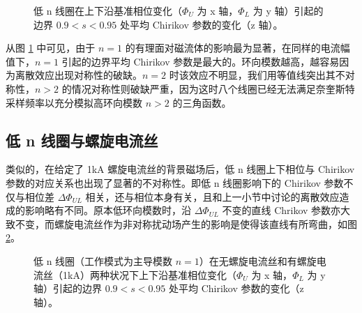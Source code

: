 \begin{figure}[t]
  \centering
  
%
  \caption{低 n 线圈在上下沿基准相位变化（$\Phi_U$ 为 x 轴，$\Phi_L$ 为 y 轴）引起的边界 $0.9<s<0.95$ 处平均 Chirikov 参数的变化（z 轴）。}
  \label{fig:lown-multi-n-Phi-scan}
\end{figure}

从图 \ref{fig:lown-multi-n-Phi-scan} 中可见，由于 $n=1$ 的有理面对磁流体的影响最为显著，在同样的电流幅值下，$n=1$ 引起的边界平均 Chirikov 参数是最大的。环向模数越高，越容易因为离散效应出现对称性的破缺。$n=2$ 时该效应不明显，我们用等值线突出其不对称性，$n>2$ 的情况对称性则破缺严重，因为这时八个线圈已经无法满足奈奎斯特采样频率以充分模拟高环向模数 $n>2$ 的三角函数。




\subsection{低 n 线圈与螺旋电流丝}

类似的，在给定了 1kA 螺旋电流丝的背景磁场后，低 n 线圈上下相位与 Chirikov 参数的对应关系也出现了显著的不对称性。即低 n 线圈影响下的 Chirikov 参数不仅与相位差 $\Delta\Phi_{UL} $ 相关，还与相位本身有关，且和上一小节中讨论的离散效应造成的影响略有不同。原本低环向模数时，沿 $\Delta\Phi_{UL} $ 不变的直线 Chrikov 参数亦大致不变，而螺旋电流丝作为非对称扰动场产生的影响是使得该直线有所弯曲，如图 \ref{fig:delta-phi-UL-HCFs-comparision}。

\begin{figure}[t]
  \centering
  \caption{低 n 线圈（工作模式为主导模数 $n=1$）在无螺旋电流丝和有螺旋电流丝（1kA）两种状况下上下沿基准相位变化（$\Phi_U$ 为 x 轴，$\Phi_L$ 为 y 轴）引起的边界 $0.9<s<0.95$ 处平均 Chirikov 参数的变化（z 轴）。}
  \label{fig:delta-phi-UL-HCFs-comparision}
\end{figure}


